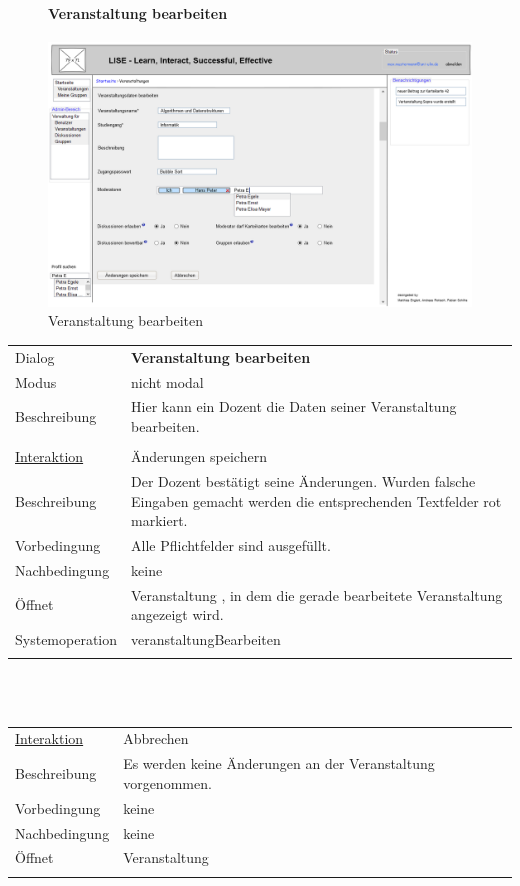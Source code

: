 \documentclass[12pt,a4paper]{article}
\begin{document}
{\begin{figure}[H]
	\paragraph{Veranstaltung bearbeiten}
	\includegraphics[width=\textwidth]{Bilder/Mockups/GUI/VeranstaltungBearbeiten.png}
	\caption{Veranstaltung bearbeiten}
	\label{VeranstaltungBearbeiten}
\end{figure}

\begin{tabular}{l p{12cm}}
Dialog 	 & \textbf{Veranstaltung bearbeiten} \\ 
Modus & nicht modal\\ 
Beschreibung   	 & Hier kann ein Dozent die Daten seiner Veranstaltung bearbeiten. \\\\

\underline{Interaktion}  	 & Änderungen speichern\\ 
Beschreibung   	 & Der Dozent bestätigt seine Änderungen. Wurden falsche Eingaben gemacht werden die entsprechenden Textfelder rot markiert. \\
Vorbedingung   	 & Alle Pflichtfelder sind ausgefüllt.\\
Nachbedingung	 & keine\\
Öffnet			 & \glqq Veranstaltung \grqq, in dem die gerade bearbeitete Veranstaltung angezeigt wird. \\
Systemoperation & veranstaltungBearbeiten\\\\
\end{tabular}\\\\

\begin{tabular}{l p{12cm}}
\underline{Interaktion}  	 & Abbrechen\\ 
Beschreibung   	 & Es werden keine Änderungen an der Veranstaltung vorgenommen.  \\
Vorbedingung	 & keine \\
Nachbedingung	 & keine \\
Öffnet			 & \glqq Veranstaltung\grqq \\\\
\end{tabular}\\\\

}
\end{document}
